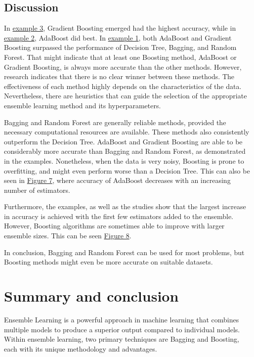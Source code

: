 \subsection{Discussion}
In \hyperref[sec:example3]{example 3}, Gradient Boosting emerged had the highest accuracy, while in \hyperref[sec:example2]{example 2},
AdaBoost did best. In \hyperref[sec:example1]{example 1}, both AdaBoost and Gradient Boosting surpassed the performance of Decision Tree,
Bagging, and Random Forest. 
That might indicate that at least one Boosting method, AdaBoost or Gradient Boosting, is always more accurate than the other methods.
However, research \citep{popular_ensemble_methods, comparison_ensemble_learning} indicates that there is no clear winner between these
methods. The effectiveness of each method highly depends on the characteristics of the data. Nevertheless, there are heuristics that can
guide the selection of the appropriate ensemble learning method and its hyperparameters.

Bagging and Random Forest are generally reliable methods, provided the necessary computational resources are available. These methods
also consistently outperform the Decision Tree.
AdaBoost and Gradient Boosting are able to be considerably more accurate than Bagging and Random Forest, as demonstrated in the examples.
Nonetheless, when the data is very noisy, Boosting is prone to overfitting, and might even perform worse than a Decision Tree.
This can also be seen in \hyperref[fig:bs_comparison]{Figure 7}, where accuracy of AdaBoost decreases with an increasing number of estimators.

Furthermore, the examples, as well as the studies show that the largest increase in accuracy is achieved with the first few estimators added to the 
ensemble. However, Boosting algorithms are sometimes able to improve with larger ensemble sizes. This can be seen \hyperref[fig:bs_comparison]{Figure 8}.

In conclusion, Bagging and Random Forest can be used for most problems, but Boosting methods might even be more accurate on suitable datasets. 

\section{Summary and conclusion}
Ensemble Learning is a powerful approach in machine learning that combines 
multiple models to produce a superior output compared to individual models.
Within ensemble learning, two primary techniques are Bagging and Boosting, 
each with its unique methodology and advantages.


